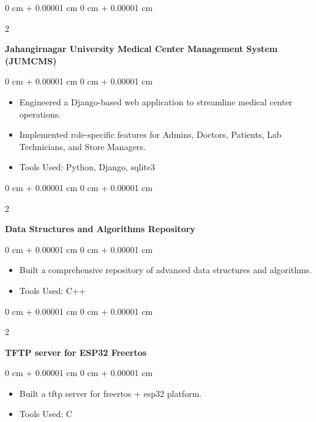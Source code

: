 \documentclass[10pt, letterpaper]{article}
\newenvironment{highlights}{
	\begin{itemize}[
		topsep=0.10 cm,
		parsep=0.10 cm,
		partopsep=0pt,
		itemsep=0pt,
		leftmargin=0 cm + 10pt
		]
	}{
	\end{itemize}
} %
\newenvironment{onecolentry}{
	\begin{adjustwidth}{
			0 cm + 0.00001 cm
		}{
			0 cm + 0.00001 cm
		}
	}{
	\end{adjustwidth}
} %
\newenvironment{twocolentry}[2][]{
	\onecolentry
	\def\secondColumn{#2}
	\setcolumnwidth{\fill, 4.5 cm}
	\begin{paracol}{2}
	}{
		\switchcolumn \raggedleft \secondColumn
	\end{paracol}
	\endonecolentry
} %
\begin{document}
	\begin{twocolentry}{
			\href{https://github.com/sudiptarathi2020/JUMCMS-Jahangirnagar-University-Medical-Center-Management-System/}{{\faGithub}}
		}
		\textbf{Jahangirnagar University Medical Center Management System (JUMCMS)}
	\end{twocolentry}
	
	
	\vspace{0.10 cm}
	\begin{onecolentry}
		\begin{highlights}
			\item Engineered a Django-based web application to streamline medical center operations.
			\item Implemented role-specific features for Admins, Doctors, Patients, Lab Technicians, and Store Managers.
			\item Tools Used: Python, Django, sqlite3
		\end{highlights}
	\end{onecolentry}
	
	\vspace{0.2 cm}
	
	\begin{twocolentry}{
			\href{https://github.com/sudiptarathi2020/Data-structures-and-Algorithms}{{\faGithub}}
		}
		\textbf{Data Structures and Algorithms Repository}\end{twocolentry}
	
	\vspace{0.10 cm}
	\begin{onecolentry}
		\begin{highlights}
			\item Built a comprehensive repository of advanced data structures and algorithms.
			\item Tools Used: C++
		\end{highlights}
	\end{onecolentry}
	
	
	\vspace{0.2 cm}
	
	\begin{twocolentry}{
			\href{https://github.com/sudiptarathi2020/tftp_server_for_freertos}{{\faGithub}}
		}
		\textbf{TFTP server for ESP32 Freertos}\end{twocolentry}
	
	\vspace{0.10 cm}
	\begin{onecolentry}
		\begin{highlights}
			\item Built a tftp server for freertos + esp32 platform.
			\item Tools Used: C
		\end{highlights}
	\end{onecolentry}
	
\end{document}

